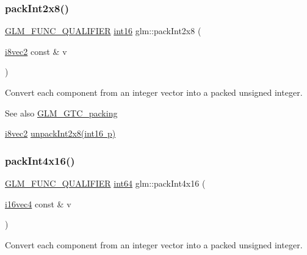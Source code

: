 \subsubsection{\texorpdfstring{pack\+Int2x8()}{packInt2x8()}}
{\footnotesize\ttfamily \mbox{\hyperlink{setup_8hpp_a33fdea6f91c5f834105f7415e2a64407}{G\+L\+M\+\_\+\+F\+U\+N\+C\+\_\+\+Q\+U\+A\+L\+I\+F\+I\+ER}} \mbox{\hyperlink{group__gtc__type__precision_ga2945a61d12771f8954994fcddf02b021}{int16}} glm\+::pack\+Int2x8 (\begin{DoxyParamCaption}\item[{\mbox{\hyperlink{group__gtc__type__precision_gade57e4b55fe2b2345a4f2ac2b149cd32}{i8vec2}} const \&}]{v }\end{DoxyParamCaption})}

Convert each component from an integer vector into a packed unsigned integer.

\begin{DoxySeeAlso}{See also}
\mbox{\hyperlink{group__gtc__packing}{G\+L\+M\+\_\+\+G\+T\+C\+\_\+packing}} 

\mbox{\hyperlink{group__gtc__type__precision_gade57e4b55fe2b2345a4f2ac2b149cd32}{i8vec2}} \mbox{\hyperlink{group__gtc__packing_ga55b4670bffab6ddb39d4a0fbf98718c1}{unpack\+Int2x8(int16 p)}} 
\end{DoxySeeAlso}
\mbox{\label{group__gtc__packing_gac3ef78d62735b5c34503c33e37e401c2}} 
\subsubsection{\texorpdfstring{pack\+Int4x16()}{packInt4x16()}}
{\footnotesize\ttfamily \mbox{\hyperlink{setup_8hpp_a33fdea6f91c5f834105f7415e2a64407}{G\+L\+M\+\_\+\+F\+U\+N\+C\+\_\+\+Q\+U\+A\+L\+I\+F\+I\+ER}} \mbox{\hyperlink{group__gtc__type__precision_ga435d75819cce297cc5fa21bd84ef89a5}{int64}} glm\+::pack\+Int4x16 (\begin{DoxyParamCaption}\item[{\mbox{\hyperlink{group__gtc__type__precision_ga99a249a4cc129cb527c48d3afd38b666}{i16vec4}} const \&}]{v }\end{DoxyParamCaption})}

Convert each component from an integer vector into a packed unsigned integer.

